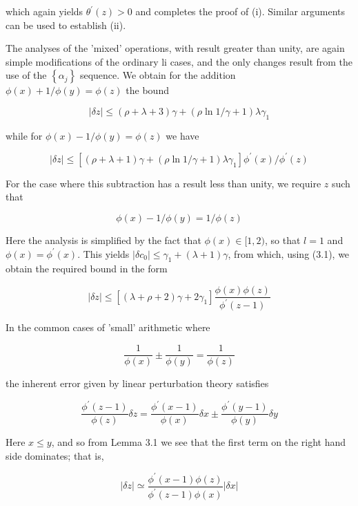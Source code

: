 \documentclass[10pt]{article}
\begin{document}
which again yields $\theta^{\prime}(z)>0$ and completes the proof of (i). Similar arguments can be used to establish (ii).

The analyses of the 'mixed' operations, with result greater than unity, are again simple modifications of the ordinary li cases, and the only changes result from the use of the $\left\{\alpha_{j}\right\}$ sequence. We obtain for the addition $\phi(x)+1 / \phi(y)=\phi(z)$ the bound


\begin{equation*}
|\delta z| \leqslant(\rho+\lambda+3) \gamma+(\rho \ln 1 / \gamma+1) \lambda \gamma_{1} \tag{3.3}
\end{equation*}


while for $\phi(x)-1 / \phi(y)=\phi(z)$ we have


\begin{equation*}
|\delta z| \leqslant\left[(\rho+\lambda+1) \gamma+(\rho \ln 1 / \gamma+1) \lambda \gamma_{1}\right] \phi^{\prime}(x) / \phi^{\prime}(z) \tag{3.4}
\end{equation*}


For the case where this subtraction has a result less than unity, we require $z$ such that

$$
\phi(x)-1 / \phi(y)=1 / \phi(z)
$$

Here the analysis is simplified by the fact that $\phi(x) \in[1,2)$, so that $l=1$ and $\phi(x)=\phi^{\prime}(x)$. This yields $\left|\delta c_{0}\right| \leqslant \gamma_{1}+(\lambda+1) \gamma$, from which, using (3.1), we obtain the required bound in the form


\begin{equation*}
|\delta z| \leqslant\left[(\lambda+\rho+2) \gamma+2 \gamma_{1}\right] \frac{\phi(x) \phi(z)}{\phi^{\prime}(z-1)} \tag{3.5}
\end{equation*}


In the common cases of 'small' arithmetic where

$$
\frac{1}{\phi(x)} \pm \frac{1}{\phi(y)}=\frac{1}{\phi(z)}
$$

the inherent error given by linear perturbation theory satisfies

$$
\frac{\phi^{\prime}(z-1)}{\phi(z)} \delta z=\frac{\phi^{\prime}(x-1)}{\phi(x)} \delta x \pm \frac{\phi^{\prime}(y-1)}{\phi(y)} \delta y
$$

Here $x \leqslant y$, and so from Lemma 3.1 we see that the first term on the right hand side dominates; that is,

$$
|\delta z| \simeq \frac{\phi^{\prime}(x-1) \phi(z)}{\phi^{\prime}(z-1) \phi(x)}|\delta x|
$$
\end{document}
